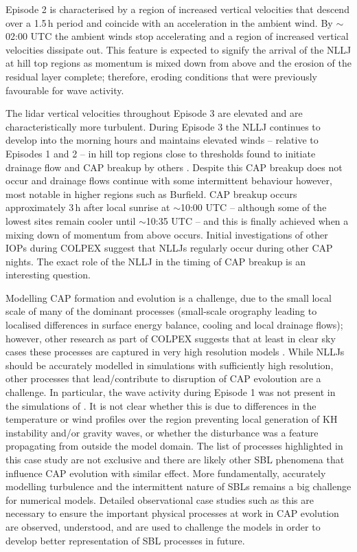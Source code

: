 \documentclass[times]{qjrms4}
\begin{document}
Episode 2 is characterised by a region of increased vertical velocities that descend over a 1.5$\,\mbox{h}$ period and coincide with an acceleration in the ambient wind. By $\sim$02:00 UTC the ambient winds stop accelerating and a region of increased vertical velocities dissipate out. This feature is expected to signify the arrival of the NLLJ at hill top regions as momentum is mixed down from above and the erosion of the residual layer complete; therefore, eroding conditions that were previously favourable for wave activity.

The lidar vertical velocities throughout Episode 3 are elevated and are characteristically more turbulent. During Episode 3 the NLLJ continues to develop into the morning hours and maintains elevated winds -- relative to Episodes 1 and 2 -- in hill top regions close to thresholds found to initiate drainage flow and CAP breakup by others \citep{barr1989influence,orgill1992mesoscale,bogren2000local,iijima2000seasonal,whiteman2001cold,vosper2008numerical}.  Despite this CAP breakup does not occur and drainage flows continue with some intermittent behaviour however, most notable in higher regions such as Burfield. CAP breakup occurs approximately 3$\,\mbox{h}$ after local sunrise at $\sim$10:00 UTC -- although some of the lowest sites remain cooler until $\sim$10:35 UTC -- and this is finally achieved when a mixing down of momentum from above occurs. Initial investigations of other IOPs during COLPEX suggest that NLLJs regularly occur during other CAP nights. The exact role of the NLLJ in the timing of CAP breakup is an interesting question.

Modelling CAP formation and evolution is a challenge, due to the small local scale of many of the dominant processes (small-scale orography leading to localised differences in surface energy balance, cooling and local drainage flows); however, other research as part of COLPEX suggests that at least in clear sky cases these processes are captured in very high resolution models \citep{vosper2013high,Vosper2013narrow,hughes2015assessment}. While NLLJs should be accurately modelled in simulations with sufficiently high resolution, other processes that lead/contribute to disruption of CAP evoloution are a challenge. In particular, the wave activity during Episode 1 was not present in the simulations of \citet{Vosper2013narrow}. It is not clear whether this is due to differences in the temperature or wind profiles over the region preventing local generation of KH instability and/or gravity waves, or whether the disturbance was a feature propagating from outside the model domain. The list of processes highlighted in this case study are not exclusive and there are likely other SBL phenomena that influence CAP evolution with similar effect. More fundamentally, accurately modelling turbulence and the intermittent nature of SBLs remains a big challenge for numerical models. Detailed observational case studies such as this are necessary to ensure the important physical processes at work in CAP evolution are observed, understood, and are used to challenge the models in order to develop better representation of SBL processes in future.
\end{document}
